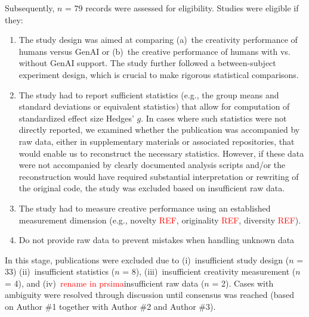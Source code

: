 \documentclass[manuscript, screen, review, acmsmall, anonymous]{acmart}
\newcommand{\TODO}[1]{\textcolor{red}{#1}}
\begin{document}
Subsequently,  $n$ = 79 records were assessed for eligibility. Studies were eligible if they:
\begin{enumerate}
  \item The study design was aimed at comparing (a)~the creativity performance of humans versus GenAI or (b)~the creative performance of humans with vs. without GenAI support. The study further followed a between-subject experiment design, which is crucial to make rigorous statistical comparisons. %
  \item The study had to report sufficient statistics (e.g., the group means and standard deviations or equivalent statistics) that allow for computation of standardized effect size Hedges' $g$. In cases where such statistics were not directly reported, we examined whether the publication was accompanied by raw data, either in supplementary materials or associated repositories, that would enable us to reconstruct the necessary statistics. However, if these data were not accompanied by clearly documented analysis scripts and/or the reconstruction would have required substantial interpretation or rewriting of the original code, the study was excluded based on insufficient raw data.
  \item The study had to measure creative performance using an established measurement dimension (e.g., novelty \TODO{REF}, originality \TODO{REF}, diversity \TODO{REF}). 
  \item Do not provide raw data to prevent mistakes when handling unknown data
\end{enumerate}
In this stage, publications were excluded due to (i)~insufficient study design ($n$ = 33) (ii)~insufficient statistics ($n$ = 8), (iii)~insufficient creativity measurement ($n$ = 4), and (iv)~\TODO{rename in prsima}insufficient raw data ($n$ = 2). Cases with ambiguity were resolved through discussion until consensus was reached (based on Author \#1 together with Author \#2 and Author \#3).
\end{document}
